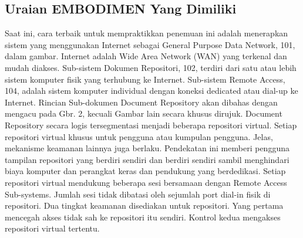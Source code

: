 \subsection{Uraian EMBODIMEN Yang Dimiliki}
Saat ini, cara terbaik untuk mempraktikkan penemuan ini adalah menerapkan sistem yang
menggunakan Internet sebagai General Purpose Data Network, 101, dalam gambar. 
Internet adalah Wide Area Network (WAN) yang terkenal dan mudah diakses. 
Sub-sistem Dokumen Repositori, 102, terdiri dari satu atau lebih sistem komputer fisik yang terhubung ke Internet. Sub-sistem Remote Access, 104, adalah sistem komputer individual dengan koneksi dedicated atau dial-up ke Internet.
Rincian Sub-dokumen Document Repository akan dibahas dengan mengacu pada Gbr. 2, 
kecuali Gambar lain secara khusus dirujuk. Document Repository secara logis tersegmentasi menjadi beberapa repositori virtual. 
Setiap repositori virtual khusus untuk pengguna atau kumpulan pengguna. Jelas, mekanisme keamanan lainnya juga berlaku. Pendekatan ini memberi pengguna tampilan repositori yang berdiri sendiri dan berdiri sendiri sambil menghindari biaya komputer dan perangkat keras dan pendukung yang berdedikasi. Setiap repositori virtual mendukung beberapa sesi bersamaan dengan Remote Access Sub-systems. 
Jumlah sesi tidak dibatasi oleh sejumlah port dial-in fisik di repositori. Dua tingkat keamanan disediakan untuk repositori. Yang pertama mencegah akses tidak sah ke repositori itu sendiri. Kontrol kedua mengakses repositori virtual tertentu.
